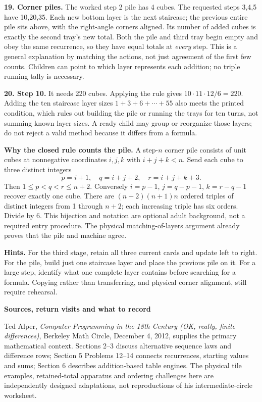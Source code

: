 \documentclass[11pt]{article}
\newcommand{\heading}[1]{\par\textbf{#1}\par}
\begin{document}
\textbf{19. Corner piles.} The worked step 2 pile has 4 cubes. The requested steps 3,4,5 have 10,20,35. Each new bottom layer is the next staircase; the previous entire pile sits above, with the right-angle corners aligned. Its number of added cubes is exactly the second tray's new total. Both the pile and third tray begin empty and obey the same recurrence, so they have equal totals at \emph{every} step. This is a general explanation by matching the actions, not just agreement of the first few counts. Children can point to which layer represents each addition; no triple running tally is necessary.

\textbf{20. Step 10.} It needs 220 cubes. Applying the rule gives $10\cdot 11\cdot 12/6=220$. Adding the ten staircase layer sizes $1+3+6+\cdots+55$ also meets the printed condition, which rules out building the pile or running the trays for ten turns, not summing known layer sizes. A ready child may group or reorganize those layers; do not reject a valid method because it differs from a formula.

\textbf{Why the closed rule counts the pile.} A step-$n$ corner pile consists of unit cubes at nonnegative coordinates $i,j,k$ with $i+j+k<n$. Send each cube to three distinct integers
\[p=i+1,\quad q=i+j+2,\quad r=i+j+k+3.\]
Then $1\le p<q<r\le n+2$. Conversely $i=p-1$, $j=q-p-1$, $k=r-q-1$ recover exactly one cube. There are $(n+2)(n+1)n$ ordered triples of distinct integers from 1 through $n+2$; each increasing triple has six orders. Divide by 6. This bijection and notation are optional adult background, not a required entry procedure. The physical matching-of-layers argument already proves that the pile and machine agree.

\textbf{Hints.} For the third stage, retain all three current cards and update left to right. For the pile, build just one staircase layer and place the previous pile on it. For a large step, identify what one complete layer contains before searching for a formula. Copying rather than transferring, and physical corner alignment, still require rehearsal.
\newpage
\heading{Sources, return visits and what to record}
Ted Alper, \emph{Computer Programming in the 18th Century (OK, really, finite differences)}, Berkeley Math Circle, December 4, 2012, supplies the primary mathematical context. Sections 2--3 discuss alternative sequence laws and difference rows; Section 5 Problems 12--14 connects recurrences, starting values and sums; Section 6 describes addition-based table engines. The physical tile examples, retained-total apparatus and ordering challenges here are independently designed adaptations, not reproductions of his intermediate-circle worksheet.
\end{document}

